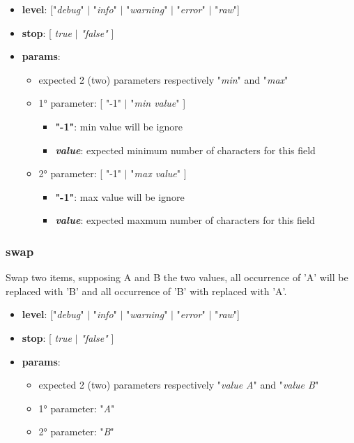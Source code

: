 \documentclass[12pt, a4paper]{book}
\begin{document}
\begin{itemize}
\item \textbf{level}: ["\textit{debug}" $|$ "\textit{info}" $|$ "\textit{warning}" $|$ "\textit{error}" $|$ "\textit{raw}"]
\item \textbf{stop}: [ \textit{true} $|$ \textit{"false"} ]
\item \textbf{params}: 
  \begin{itemize}
  \item expected 2 (two) parameters respectively "\textit{min}" and "\textit{max}"
  \item 1° parameter: [ "-1" $|$ "\textit{min value}" ]
    \begin{itemize}
    \item \textbf{"-1"}: min value will be ignore
    \item \textbf{\textit{value}}: expected minimum number of characters for this field
    \end{itemize}
  \item 2° parameter: [ "-1" $|$ "\textit{max value}" ]
    \begin{itemize}
    \item \textbf{"-1"}: max value will be ignore
    \item \textbf{\textit{value}}: expected maxmum number of characters for this field
    \end{itemize}
  \end{itemize}
\end{itemize}


\subsubsection{swap}
\begin{justify}
Swap two items, supposing A and B the two values, all occurrence of 'A' will be replaced with 'B' and all occurrence of 'B' with replaced with 'A'. 
\end{justify}

\begin{itemize}
\item \textbf{level}: ["\textit{debug}" $|$ "\textit{info}" $|$ "\textit{warning}" $|$ "\textit{error}" $|$ "\textit{raw}"]
\item \textbf{stop}: [ \textit{true} $|$ \textit{"false"} ]
\item \textbf{params}: 
  \begin{itemize}
  \item expected 2 (two) parameters respectively "\textit{value A}" and "\textit{value B}"
  \item 1° parameter: "\textit{A}"
  \item 2° parameter: "\textit{B}"
  \end{itemize}
\end{itemize}
\end{document}
